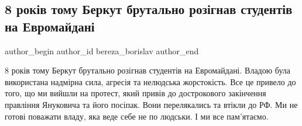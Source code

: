  
 
 
 
 
 
\subsection{8 років тому Беркут брутально розігнав студентів на Евромайдані}
\label{sec:30_11_2021.fb.bereza_borislav.1.berkut_evromaidan}
 
\ifcmt
 author_begin
   author_id bereza_borislav
 author_end
\fi

8 років тому Беркут брутально розігнав студентів на Евромайдані. Владою була
використана надмірна сила, агресія та нелюдська жорстокість. Все це привело до
того, що ми вийшли на протест, який привів до дострокового закінчення правління
Януковича та його посіпак. Вони перелякались та втікли до РФ. Ми не готові
поважати владу, яка веде себе не по людськи. І ми все пам'ятаємо.


